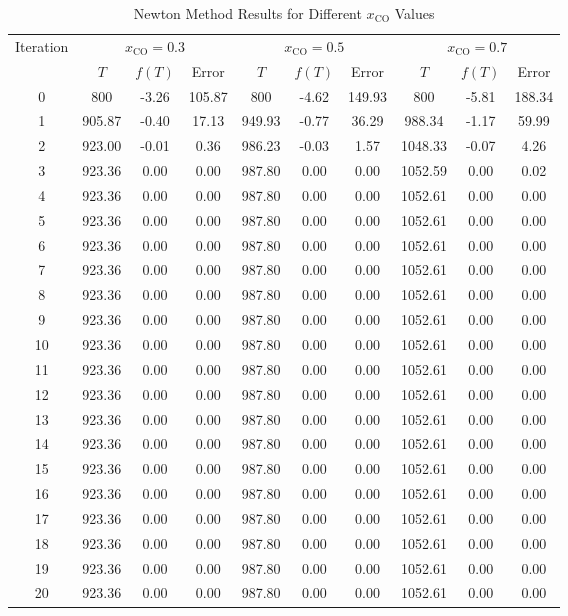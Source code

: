 \documentclass[10pt]{article}
\begin{document}
\begin{table}[H]
\centering
\caption{Newton Method Results for Different \( x_{\text{CO}} \) Values}
\begin{tabular}{cccccccccc}
\toprule
Iteration & \multicolumn{3}{c}{\( x_{\text{CO}} = 0.3 \)} & \multicolumn{3}{c}{\( x_{\text{CO}} = 0.5 \)} & \multicolumn{3}{c}{\( x_{\text{CO}} = 0.7 \)} \\
\cmidrule(r){2-10}
 & \( T \) & \( f(T) \) & Error & \( T \) & \( f(T) \) & Error & \( T \) & \( f(T) \) & Error \\
\midrule
0 & 800 & -3.26 & 105.87 & 800 & -4.62 & 149.93 & 800 & -5.81 & 188.34 \\
1 & 905.87 & -0.40 & 17.13 & 949.93 & -0.77 & 36.29 & 988.34 & -1.17 & 59.99 \\
2 & 923.00 & -0.01 & 0.36 & 986.23 & -0.03 & 1.57 & 1048.33 & -0.07 & 4.26 \\
3 & 923.36 & 0.00 & 0.00 & 987.80 & 0.00 & 0.00 & 1052.59 & 0.00 & 0.02 \\
4 & 923.36 & 0.00 & 0.00 & 987.80 & 0.00 & 0.00 & 1052.61 & 0.00 & 0.00 \\
5 & 923.36 & 0.00 & 0.00 & 987.80 & 0.00 & 0.00 & 1052.61 & 0.00 & 0.00 \\
6 & 923.36 & 0.00 & 0.00 & 987.80 & 0.00 & 0.00 & 1052.61 & 0.00 & 0.00 \\
7 & 923.36 & 0.00 & 0.00 & 987.80 & 0.00 & 0.00 & 1052.61 & 0.00 & 0.00 \\
8 & 923.36 & 0.00 & 0.00 & 987.80 & 0.00 & 0.00 & 1052.61 & 0.00 & 0.00 \\
9 & 923.36 & 0.00 & 0.00 & 987.80 & 0.00 & 0.00 & 1052.61 & 0.00 & 0.00 \\
10 & 923.36 & 0.00 & 0.00 & 987.80 & 0.00 & 0.00 & 1052.61 & 0.00 & 0.00 \\
11 & 923.36 & 0.00 & 0.00 & 987.80 & 0.00 & 0.00 & 1052.61 & 0.00 & 0.00 \\
12 & 923.36 & 0.00 & 0.00 & 987.80 & 0.00 & 0.00 & 1052.61 & 0.00 & 0.00 \\
13 & 923.36 & 0.00 & 0.00 & 987.80 & 0.00 & 0.00 & 1052.61 & 0.00 & 0.00 \\
14 & 923.36 & 0.00 & 0.00 & 987.80 & 0.00 & 0.00 & 1052.61 & 0.00 & 0.00 \\
15 & 923.36 & 0.00 & 0.00 & 987.80 & 0.00 & 0.00 & 1052.61 & 0.00 & 0.00 \\
16 & 923.36 & 0.00 & 0.00 & 987.80 & 0.00 & 0.00 & 1052.61 & 0.00 & 0.00 \\
17 & 923.36 & 0.00 & 0.00 & 987.80 & 0.00 & 0.00 & 1052.61 & 0.00 & 0.00 \\
18 & 923.36 & 0.00 & 0.00 & 987.80 & 0.00 & 0.00 & 1052.61 & 0.00 & 0.00 \\
19 & 923.36 & 0.00 & 0.00 & 987.80 & 0.00 & 0.00 & 1052.61 & 0.00 & 0.00 \\
20 & 923.36 & 0.00 & 0.00 & 987.80 & 0.00 & 0.00 & 1052.61 & 0.00 & 0.00 \\
\bottomrule
\end{tabular}
\end{table}
\end{document}
